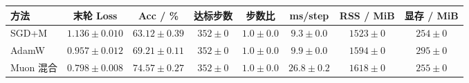 \begin{tabular}{lccccccc}\toprule
方法 & 末轮 Loss & Acc / \% & 达标步数 & 步数比 & ms/step & RSS / MiB & 显存 / MiB \\ \midrule
SGD+M & $1.136\pm0.010$ & $63.12\pm0.39$ & $352\pm0$ & $1.0\pm0.0$ & $9.3\pm0.0$ & $1523\pm0$ & $254\pm0$ \\
AdamW & $0.957\pm0.012$ & $69.21\pm0.11$ & $352\pm0$ & $1.0\pm0.0$ & $9.9\pm0.0$ & $1594\pm0$ & $295\pm0$ \\
Muon 混合 & $0.798\pm0.008$ & $74.57\pm0.27$ & $352\pm0$ & $1.0\pm0.0$ & $26.8\pm0.2$ & $1618\pm0$ & $255\pm0$ \\
\bottomrule\end{tabular}
